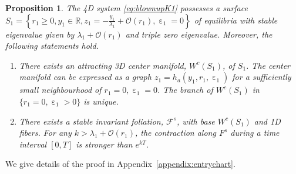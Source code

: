 \documentclass[10pt,onecolumn]{article}
\theoremstyle{plain}
\newtheorem{proposition}{Proposition}[section]
\DeclareMathOperator{\eps}{\varepsilon}
\begin{document}
\begin{proposition}  \label{prop:entrychart}
The 4D system \eqref{eq:blownupK1} possesses a surface $S_1 = \left\{ r_1 \geq 0, y_1 \in \mathbb R, z_1 = -\tfrac{y_1}{\lambda_1}+\mathcal O(r_1), \eps_1 = 0 \right\}$ of equilibria with stable eigenvalue given by $\lambda_1 + \mathcal O(r_1)$ and triple zero eigenvalue. Moreover, the following statements hold.
\begin{enumerate}[label=(\roman*)]
  \item There exists an attracting 3D center manifold, $W^c(S_1)$, of $S_1$. The center manifold can be expressed as a graph $z_1 = h_a(y_1,r_1,\eps_1)$ for a sufficiently small neighbourhood of $r_1=0,\eps_1=0$. The branch of $W^c(S_1)$ in $\{ r_1=0, \eps_1>0 \}$ is unique.
  \item There exists a stable invariant foliation, $\mathcal F^s$, with base $W^c(S_1)$ and 1D fibers. For any $k>\lambda_1 + \mathcal O(r_1)$, the contraction along $F^s$ during a time interval $[0,T]$ is stronger than $e^{kT}$.
\end{enumerate} 
\end{proposition}

We give details of the proof in Appendix~\ref{appendix:entrychart}.

\end{document}
